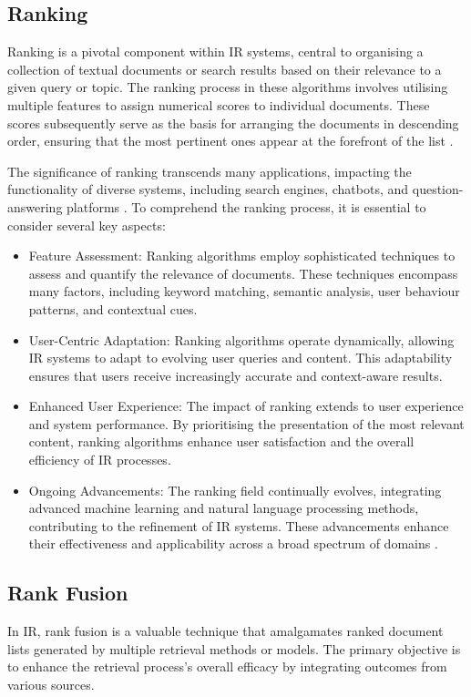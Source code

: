 \subsection{Ranking}
Ranking is a pivotal component within IR systems, central to organising a collection of textual documents or search results based on their relevance to a given query or topic. The ranking process in these algorithms involves utilising multiple features to assign numerical scores to individual documents. These scores subsequently serve as the basis for arranging the documents in descending order, ensuring that the most pertinent ones appear at the forefront of the list \cite{wu}.

The significance of ranking transcends many applications, impacting the functionality of diverse systems, including search engines, chatbots, and question-answering platforms \cite{nlp}. To comprehend the ranking process, it is essential to consider several key aspects:

\begin{itemize}
    \item Feature Assessment: Ranking algorithms employ sophisticated techniques to assess and quantify the relevance of documents. These techniques encompass many factors, including keyword matching, semantic analysis, user behaviour patterns, and contextual cues.
    \item User-Centric Adaptation: Ranking algorithms operate dynamically, allowing IR systems to adapt to evolving user queries and content. This adaptability ensures that users receive increasingly accurate and context-aware results.
    \item Enhanced User Experience: The impact of ranking extends to user experience and system performance. By prioritising the presentation of the most relevant content, ranking algorithms enhance user satisfaction and the overall efficiency of IR processes.
    \item Ongoing Advancements: The ranking field continually evolves, integrating advanced machine learning and natural language processing methods, contributing to the refinement of IR systems. These advancements enhance their effectiveness and applicability across a broad spectrum of domains \cite{nlp}.
\end{itemize}

\subsection{Rank Fusion}
In IR, rank fusion is a valuable technique that amalgamates ranked document lists generated by multiple retrieval methods or models. The primary objective is to enhance the retrieval process's overall efficacy by integrating outcomes from various sources.

